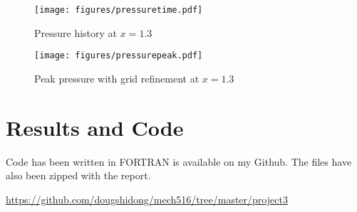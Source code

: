 \documentclass[letterpaper,12pt,]{article}
\begin{document}
\begin{figure}[htb]%
    \texttt{[image: figures/pressuretime.pdf]}
    \caption{Pressure history at $x = 1.3$}
    \label{fig:ptime}
\end{figure}
\begin{figure}[htb]%
    \texttt{[image: figures/pressurepeak.pdf]}
    \caption{Peak pressure with grid refinement at $x = 1.3$}
    \label{fig:peak}
\end{figure}


\section*{Results and Code}

Code has been written in FORTRAN is available on my Github. The files have also been zipped with the report.

\url{https://github.com/dougshidong/mech516/tree/master/project3}
\end{document}
